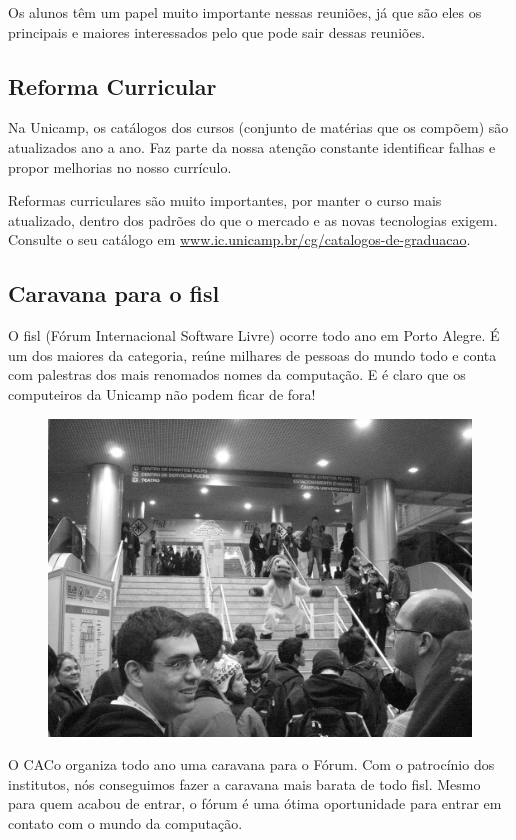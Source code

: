 Os alunos têm um papel muito importante nessas reuniões, já que são eles os
principais e maiores interessados pelo que pode sair dessas reuniões.

\subsection{Reforma Curricular}

Na Unicamp, os catálogos dos cursos (conjunto de matérias que os compõem)
são atualizados ano a ano. Faz parte da nossa atenção constante identificar falhas
e propor melhorias no nosso currículo.

Reformas curriculares são muito importantes, por manter o curso mais atualizado,
dentro dos padrões do que o mercado e as novas tecnologias exigem. Consulte o seu
catálogo em \url{www.ic.unicamp.br/cg/catalogos-de-graduacao}.

\subsection{Caravana para o fisl}

O fisl (Fórum Internacional Software Livre) ocorre todo ano em Porto Alegre.
É um dos maiores da categoria, reúne milhares de pessoas do mundo todo e conta
com palestras dos mais renomados nomes da computação. E é claro que os
computeiros da Unicamp não podem ficar de fora!
\begin{figure}[h!]
    \vspace{-10pt}
    \centering
    \includegraphics[scale=0.58, keepaspectratio=true]{img/imgs/21-CACo/fisl11_1.jpg}
    \vspace{-10pt}
\end{figure}
O CACo organiza todo ano uma
caravana para o Fórum. Com o patrocínio dos institutos, nós conseguimos fazer
a caravana mais barata de todo fisl. Mesmo para quem acabou de entrar, o fórum
é uma ótima oportunidade para entrar em contato com o mundo da computação.


